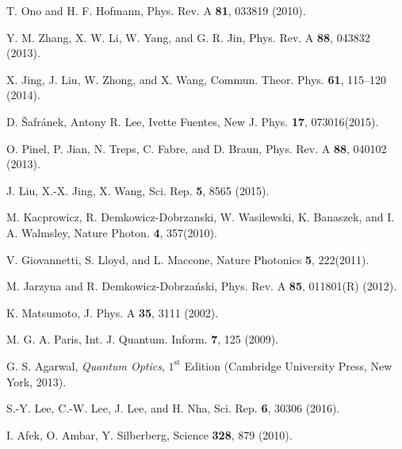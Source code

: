 \documentclass[aps,pra,reprint,showpacs,groupedaddress]{revtex4-1}
\begin{document}
\begin{thebibliography}{}
T. Ono and H. F. Hofmann,
Phys. Rev. A \textbf{81}, 033819 (2010).


Y. M. Zhang, X. W. Li, W. Yang, and G. R. Jin,
Phys. Rev. A \textbf{88}, 043832 (2013).


X. Jing, J. Liu, W. Zhong, and X. Wang,
Commun. Theor. Phys. \textbf{61}, 115–120 (2014).


D. \v{S}afr\'{a}nek, Antony R. Lee, Ivette Fuentes,
New J. Phys. \textbf{17}, 073016(2015).

O. Pinel, P. Jian, N. Treps, C. Fabre, and D. Braun,
Phys. Rev. A \textbf{88}, 040102 (2013).



J. Liu, X.-X. Jing, X. Wang,
Sci. Rep. \textbf{5}, 8565 (2015).

M. Kacprowicz, R. Demkowicz-Dobrzanski, W. Wasilewski, K. Banaszek, and I. A. Walmsley,
Nature Photon. \textbf{4}, 357(2010).


V. Giovannetti, S. Lloyd, and L. Maccone,
Nature Photonics \textbf{5}, 222(2011).

M. Jarzyna and R. Demkowicz-Dobrza\'{n}ski,
Phys. Rev. A \textbf{85}, 011801(R) (2012).


K. Matsumoto,
J. Phys. A \textbf{35}, 3111 (2002).

M. G. A. Paris,
Int. J. Quantum. Inform. \textbf{7}, 125 (2009).

G. S. Agarwal, \textit{Quantum Optics}, $1^\text{st}$ Edition (Cambridge University Press, New York, 2013).


S.-Y. Lee, C.-W. Lee, J. Lee, and H. Nha,
Sci. Rep. \textbf{6}, 30306 (2016).

I. Afek, O. Ambar, Y. Silberberg,
Science \textbf{328}, 879 (2010).


\end{thebibliography}
\end{document}

